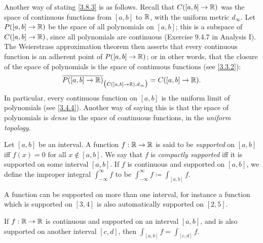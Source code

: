 \begin{note}
  Another way of stating \cref{3.8.3} is as follows.
  Recall that \(C([a, b] \to \mathbb{R})\) was the space of continuous functions from \([a, b]\) to \(\mathbb{R}\), with the uniform metric \(d_\infty\).
  Let \(P([a, b] \to \mathbb{R})\) be the space of all polynomials on \([a, b]\);
  this is a subspace of \(C([a, b] \to \mathbb{R})\), since all polynomials are continuous (Exercise 9.4.7 in Analysis I).
  The Weierstrass approximation theorem then asserts that every continuous function is an adherent point of \(P([a, b] \to \mathbb{R})\);
  or in other words, that the closure of the space of polynomials is the space of continuous functions (see \cref{3.3.2}):
  \[
    \overline{P([a, b] \to \mathbb{R})}_{\big(C([a, b] \to \mathbb{R}), d_\infty\big)} = C([a, b] \to \mathbb{R}).
  \]
  In particular, every continuous function on \([a, b]\) is the uniform limit of polynomials (see \cref{3.4.4}).
  Another way of saying this is that the space of polynomials is \emph{dense} in the space of continuous functions, in the \emph{uniform topology}.
\end{note}

\begin{defn}\label{3.8.4}
  Let \([a, b]\) be an interval.
  A function \(f : \mathbb{R} \to \mathbb{R}\) is said to be \emph{supported} on \([a, b]\) iff \(f(x) = 0\) for all \(x \notin [a, b]\).
  We say that \(f\) is \emph{compactly supported} iff it is supported on some interval \([a, b]\).
  If \(f\) is continuous and supported on \([a, b]\), we define the improper integral \(\int_{-\infty}^\infty f\) to be \(\int_{-\infty}^\infty f \coloneqq \int_{[a, b]} f\).
\end{defn}

\begin{note}
  A function can be supported on more than one interval, for instance a function which is supported on \([3, 4]\) is also automatically supported on \([2, 5]\).
\end{note}

\begin{lem}\label{3.8.5}
  If \(f : \mathbb{R} \to \mathbb{R}\) is continuous and supported on an interval \([a, b]\), and is also supported on another interval \([c, d]\), then \(\int_{[a, b]} f = \int_{[c, d]} f\).
\end{lem}

